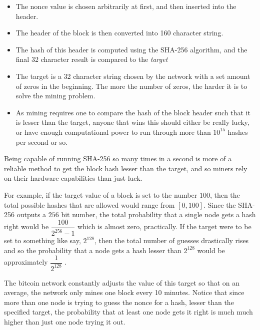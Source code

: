 \documentclass[12pt,a4paper]{report}
\begin{document}
\begin{justify}
\begin{itemize}
    \item The nonce value is chosen arbitrarily at first, and then inserted into the header.
    \item The header of the block is then converted into 160 character string.
    \item The hash of this header is computed using the SHA-256 algorithm, and the final 32 character result is compared to the \textit{target}
    \item The target is a 32 character string chosen by the network with a set amount of zeros in the beginning. The more the number of zeros, the harder it is to solve the mining problem.
    \item As mining requires one to compare the hash of the block header such that it is lesser than the target, anyone that wins this should either be really lucky, or have enough computational power to run through more than $10^{15}$ hashes per second or so. 
    
\end{itemize}
\vspace{10mm}

Being capable of running SHA-256 so many times in a second is more of a reliable method to get the block hash lesser than the target, and so miners rely on their hardware capabilities than just luck. \newline

For example, if the target value of a block is set to the number $100$, then the total possible hashes that are allowed would range from $[0,100]$. Since the SHA-256 outputs a $256$ bit number, the total probability that a single node gets a hash right would be $\dfrac{100}{2^{256}-1}$ which is almost zero, practically.\newline
If the target were to be set to something like say, $2^{128}$, then the total number of guesses drastically rises and so the probability that a node gets a hash lesser than $2^{128}$ would be approximately $\dfrac{1}{2^{128}}$  .

\vspace{10mm}
The bitcoin network constantly adjusts the value of this target so that on an average, the network only mines one block every 10 minutes. Notice that since more than one node is trying to guess the nonce for a hash, lesser than the specified target, the probability that at least one node gets it right is much much higher than just one node trying it out.


\end{justify}
\end{document}

